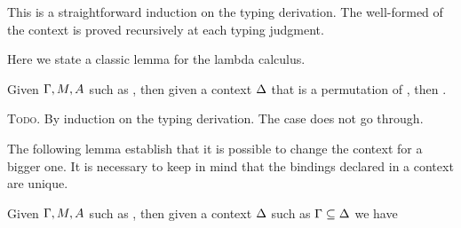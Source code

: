 \begin{Proof}
This is a straightforward induction on the typing derivation. The well-formed
of the context is proved recursively at each typing judgment.
\end{Proof}

Here we state a classic lemma for the lambda calculus.
\begin{Lemma}
Given $\Gamma,M,A$ such as , then given a 
context $\Delta$ that is a permutation of \Context{}, then .
\end{Lemma}

\begin{WarningProof}
\textsc{Todo}. By induction on the typing derivation. The \CicWeak case does not go through.
\end{WarningProof}

The following lemma establish that it is possible to change the context for a 
bigger one. It is necessary to keep in mind that the bindings declared 
in a context are unique.
\begin{Lemma}
\label{lemma:ContextInvariance}
Given $\Gamma,M,A$ such as , then given a 
context $\Delta$ such as 
$\Gamma \subseteq  \Delta$ we have 
\end{Lemma}

